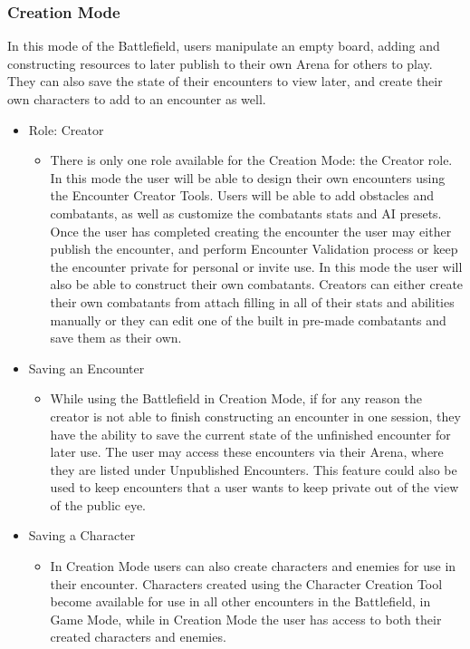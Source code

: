 \documentclass[12pt,a4paper]{report}
\begin{document}
		\subsubsection{Creation Mode}
		In this mode of the Battlefield, users manipulate an empty board, adding and constructing resources to later publish to their own Arena for others to play. They can also save the state of their encounters to view later, and create their own characters to add to an encounter as well.
		\begin{itemize}
			\item Role: Creator
			\begin{itemize}
				\item There is only one role available for the Creation Mode: the Creator role. In this mode the user will be able to design their own encounters using the Encounter Creator Tools. Users will be able to add obstacles and combatants, as well as customize the combatants stats and AI presets. Once the user has completed creating the encounter the user may either publish the encounter, and perform Encounter Validation process or keep the encounter private for personal or invite use. In this mode the user will also be able to construct their own combatants. Creators  can either create their own combatants from attach filling in all of their stats and abilities manually or they can edit one of the built in pre-made combatants and save them as their own.
			\end{itemize}
			\item Saving an Encounter
				\begin{itemize}
					\item While using the Battlefield in Creation Mode, if for any reason the creator is not able to finish constructing an encounter in one session, they have the ability to save the current state of the unfinished encounter for later use. The user may access these encounters via their Arena, where they are listed under Unpublished Encounters. This feature could also be used to keep encounters that a user wants to keep private out of the view of the public eye.
				\end{itemize}
			\item Saving a Character
				\begin{itemize}
					\item In Creation Mode users can also create characters and enemies for use in their encounter. Characters created using the Character Creation Tool become available for use in all other encounters in the Battlefield, in Game Mode, while in Creation Mode the user has access to both their created characters and enemies.
				\end{itemize}
		\end{itemize}
		
\end{document}
